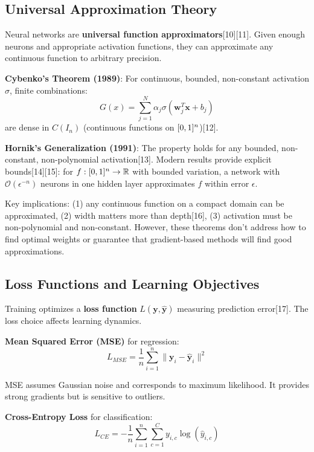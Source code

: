 \documentclass[11pt,a4paper]{report}
\begin{document}
\subsection{Universal Approximation Theory}

Neural networks are \textbf{universal function approximators}[10][11]. Given enough neurons and appropriate activation functions, they can approximate any continuous function to arbitrary precision.

\textbf{Cybenko's Theorem (1989)}: For continuous, bounded, non-constant activation $\sigma$, finite combinations:
\begin{equation}
G(x) = \sum_{j=1}^{N} \alpha_j \sigma(\mathbf{w}_j^T \mathbf{x} + b_j)
\end{equation}
are dense in $C(I_n)$ (continuous functions on $[0,1\relax]^n$)[12].

\textbf{Hornik's Generalization (1991)}: The property holds for any bounded, non-constant, non-polynomial activation[13]. Modern results provide explicit bounds[14][15]: for $f: [0,1\relax]^n \rightarrow \mathbb{R}$ with bounded variation, a network with $\mathcal{O}(\epsilon^{-n})$ neurons in one hidden layer approximates $f$ within error $\epsilon$.

Key implications: (1) any continuous function on a compact domain can be approximated, (2) width matters more than depth[16], (3) activation must be non-polynomial and non-constant. However, these theorems don't address how to find optimal weights or guarantee that gradient-based methods will find good approximations.

\subsection{Loss Functions and Learning Objectives}

Training optimizes a \textbf{loss function} $L(\mathbf{y}, \hat{\mathbf{y}})$ measuring prediction error[17]. The loss choice affects learning dynamics.

\textbf{Mean Squared Error (MSE)} for regression:
\begin{equation}
L_{MSE} = \frac{1}{n} \sum_{i=1}^{n} \|\mathbf{y}_i - \hat{\mathbf{y}}_i\|^2
\end{equation}

MSE assumes Gaussian noise and corresponds to maximum likelihood. It provides strong gradients but is sensitive to outliers.

\textbf{Cross-Entropy Loss} for classification:
\begin{equation}
L_{CE} = -\frac{1}{n} \sum_{i=1}^{n} \sum_{c=1}^{C} y_{i,c} \log(\hat{y}_{i,c})
\end{equation}
\end{document}
